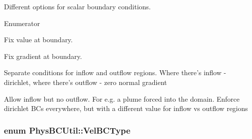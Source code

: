 Different options for scalar boundary conditions. 

\begin{Desc}
\item[Enumerator]\par
\begin{description}
\item[{\em 
\hypertarget{class_phys_b_c_util_a1beb9821cf9e783e3742b82b7070c97aa3c458c6b8958fb7d8f8f575725a0e91c}{Dirichlet}\label{class_phys_b_c_util_a1beb9821cf9e783e3742b82b7070c97aa3c458c6b8958fb7d8f8f575725a0e91c}
}]Fix value at boundary. \item[{\em 
\hypertarget{class_phys_b_c_util_a1beb9821cf9e783e3742b82b7070c97aae1ec2629a88cd0c687f102296e995d6b}{Neumann}\label{class_phys_b_c_util_a1beb9821cf9e783e3742b82b7070c97aae1ec2629a88cd0c687f102296e995d6b}
}]Fix gradient at boundary. \item[{\em 
\hypertarget{class_phys_b_c_util_a1beb9821cf9e783e3742b82b7070c97aae85fc8bb407faa51331a6602f82577b7}{Inflow\-Outflow}\label{class_phys_b_c_util_a1beb9821cf9e783e3742b82b7070c97aae85fc8bb407faa51331a6602f82577b7}
}]Separate conditions for inflow and outflow regions. Where there's inflow -\/ dirichlet, where there's outflow -\/ zero normal gradient \item[{\em 
\hypertarget{class_phys_b_c_util_a1beb9821cf9e783e3742b82b7070c97aa3f9f8b4486f10b1ae3cef04b812d882f}{Only\-Inflow}\label{class_phys_b_c_util_a1beb9821cf9e783e3742b82b7070c97aa3f9f8b4486f10b1ae3cef04b812d882f}
}]Allow inflow but no outflow. For e.\-g. a plume forced into the domain. Enforce dirichlet B\-Cs everywhere, but with a different value for inflow vs outflow regions \end{description}
\end{Desc}
\hypertarget{class_phys_b_c_util_a1aaacd3006840779878dc6287355a358}{
\subsubsection[{Vel\-B\-C\-Type}]{\setlength{\rightskip}{0pt plus 5cm}enum {\bf Phys\-B\-C\-Util\-::\-Vel\-B\-C\-Type}}}\label{class_phys_b_c_util_a1aaacd3006840779878dc6287355a358}


